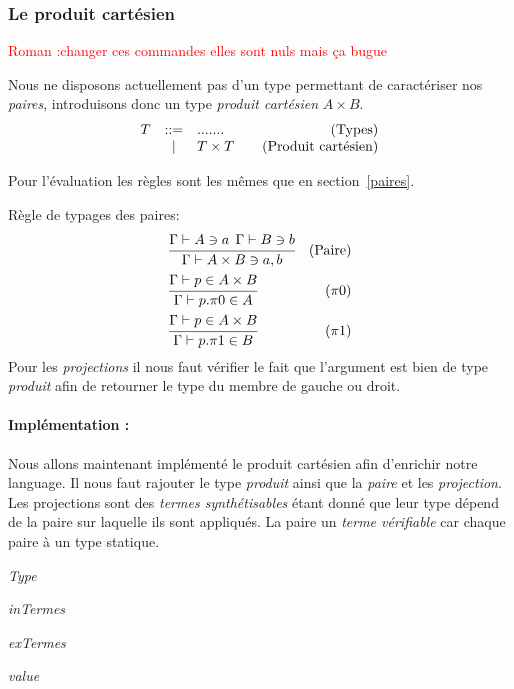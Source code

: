 \documentclass {article}
\makeatletter
\newcommand{\codefrom}[3]
           {}
\theoremstyle{definition}
\theoremstyle{remark}
\newcommand{\todo}[1]{\textcolor{red}{#1}}
\newenvironment{bnf}
               {\[\begin{array}{lcl@{\qquad}r}}
               {\end{array}\]}
\makeatother
\begin{document}
\subsubsection{Le produit cartésien}
\label{produit_cartesien}

\todo{Roman :changer ces commandes elles sont nuls mais ça bugue}
\newcommand{\pair}[2]{\ensuremath{#1,#2}}
\newcommand{\produit}[2]{\ensuremath{#1\times#2}}
\newcommand{\projun}[1]{\ensuremath{\pi0.#1}}
\newcommand{\projdeux}[1]{\ensuremath{\pi1.#1}}


Nous ne disposons actuellement pas d'un type permettant de caractériser nos \emph{paires},
introduisons donc un type \emph{produit cartésien} \produit{A}{B}.
\begin{bnf}
  T &::= &....... &\mbox{(Types)} \\
  &|& T\times T & \mbox{(Produit cartésien)} \\
\end{bnf}

Pour l'évaluation les règles sont les mêmes que en section~\ref{paires}.

Règle de typages des paires: 
\begin{align*}
  &\cfrac{\Gamma\vdash A\ni a \:\: \Gamma\vdash B\ni b}
  {\Gamma\vdash A\times B \ni a,b}&\mbox{(Paire)} \\
  &\cfrac{\Gamma\vdash p \in A\times B} 
  {\Gamma\vdash p.\pi 0 \in A}&\mbox{($\pi 0$)} \\
  &\cfrac{\Gamma\vdash p \in A\times B} 
  {\Gamma\vdash p.\pi 1 \in B}&\mbox{($\pi 1$)} \\
\end{align*}
Pour les \emph{projections} il nous faut vérifier le fait que l'argument est bien de type \emph{produit} afin de
retourner le type du membre de gauche ou droit.

\paragraph{Implémentation :}
Nous allons maintenant implémenté le produit cartésien afin d'enrichir
notre language. Il nous faut rajouter le type \emph{produit} ainsi que la \emph{paire}
et les \emph{projection}.
Les projections sont des \emph{termes synthétisables} étant donné que leur type dépend de la paire
sur laquelle ils sont appliqués. La paire un \emph{terme vérifiable} car chaque paire à un type statique.

\emph{Type}
\codefrom{typed}{lambda}{type_pair}
\emph{inTermes}
\codefrom{typed}{lambda}{inTm_pair}
\emph{exTermes}
\codefrom{typed}{lambda}{exTm_pair}
\emph{value}
\codefrom{typed}{lambda}{value_pair}
\end{document}
